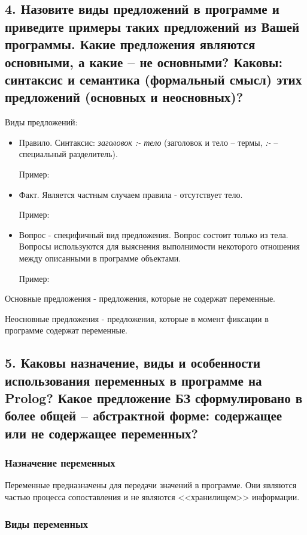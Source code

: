 \documentclass[a4paper,12pt]{article}
\begin{document}
	\subsection*{4.	Назовите виды предложений в программе и приведите примеры таких предложений из Вашей программы. Какие предложения являются основными, а какие – не основными?  Каковы: синтаксис и семантика (формальный смысл) этих предложений (основных и неосновных)?}
	
	Виды предложений:
	
	\begin{itemize}
		\item Правило. Синтаксис: \textit{заголовок :- тело} (заголовок и тело – термы, \textit{:-} – специальный разделитель).
		
		Пример:
		
		\item Факт. Является частным случаем правила - отсутствует тело.
		
		Пример:
		
		
		\item Вопрос - специфичный вид предложения. Вопрос состоит только из тела. Вопросы используются для выяснения выполнимости некоторого отношения между описанными в программе объектами. 
		
		Пример:
		
		
	\end{itemize}

	Основные предложения - предложения, которые не содержат переменные.
	
	Неосновные предложения - предложения, которые в момент фиксации в программе содержат переменные.
	
	\subsection*{5.	Каковы назначение, виды и особенности использования переменных в программе на Prolog? Какое предложение БЗ сформулировано в более общей – абстрактной форме: содержащее или не содержащее переменных?}
	
	\subsubsection*{Назначение переменных}
	
	Переменные предназначены для передачи значений в программе. Они являются частью процесса сопоставления и не являются <<хранилищем>> информации.
	
	\subsubsection*{Виды переменных}
	
\end{document}
